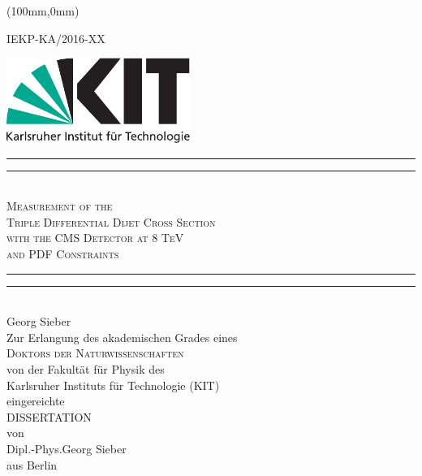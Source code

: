 \begin{titlepage}
    \begin{center}
        \begin{textblock*}{5cm}(100mm,0mm)
            \begin{flushright}
                \small
                IEKP-KA/2016-XX
            \end{flushright}
        \end{textblock*}
        \includegraphics[width=6.0cm]{figures/Kitlogo_de_cmyk}
        \vspace*{3cm}

        \vspace*{\baselineskip}
        \rule{\textwidth}{1.6pt}\vspace*{-\baselineskip}\vspace*{2pt}
        \rule{\textwidth}{0.4pt}\\[\baselineskip]
        \LARGE{\textsc{Measurement of the\\
            Triple Differential Dijet Cross Section\\
            with the CMS Detector at 8 TeV\\
            and PDF Constraints}}\\
        \rule{\textwidth}{0.4pt}\vspace*{-\baselineskip}\vspace{3.2pt}
        \rule{\textwidth}{1.6pt}\\[\baselineskip]
        \LARGE{Georg Sieber}\\
        \vspace{3ex}
        \Large Zur Erlangung des akademischen Grades eines\\[1.5ex]
        \textsc{Doktors der Naturwissenschaften}\\[1.5ex]
            von der Fakult\"at f\"ur Physik des\\
        Karlsruher Instituts f\"ur Technologie (KIT)\\ 
        \vspace{1ex}
        eingereichte\\
        \vspace{1ex}
        DISSERTATION\\
        \vspace{1ex}
        von\\
        \vspace{1ex}
        Dipl.-Phys.\;Georg Sieber\\aus Berlin\\
        \vspace{1.5 cm}


\end{center}
\end{titlepage}
